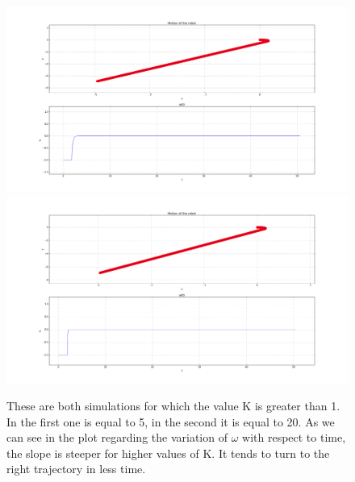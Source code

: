 \documentclass[a4paper,11pt,oneside]{book}
\begin{document}
\begin{figure}[H]
\centering
\hspace*{-1.5in}
\includegraphics[width=1.5\textwidth]{figs/simulations/2_2}%
\qquad\qquad
\hspace*{-1.5in}
\includegraphics[width=1.5\textwidth]{figs/simulations/5_2}
\caption[Simulation: K = 5, K = 20]{These are both simulations for which the value K is greater than 1. In the first one is equal to 5, in the second it is equal to 20. As we can see in the plot regarding the variation of $\omega$ with respect to time, the slope is steeper for higher values of K. It tends to turn to the right trajectory in less time.}
\end{figure}
\end{document}

